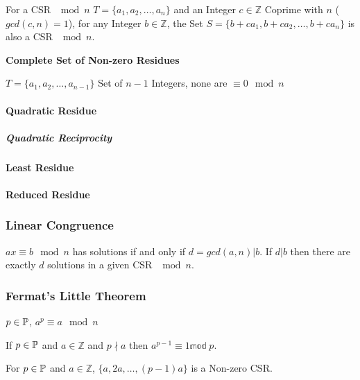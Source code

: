 For a CSR $\mod n$ $T = \{a_1, a_2, \ldots, a_n\}$ and an
Integer $c \in \mathbb{Z}$ Coprime with $n$ ($gcd(c,n) = 1$), for any
Integer $b \in \mathbb{Z}$, the Set $S = \{b + ca_1, b + ca_2, \ldots,
b + ca_n \}$ is also a CSR $\mod n$.



\textbf{Complete Set of Non-zero Residues}

$T = \{ a_1, a_2, \ldots, a_{n-1} \}$ Set of $n-1$ Integers, none are
$\equiv 0 \mod n$



\paragraph{Quadratic Residue}\label{sec:quadratic_residue}\hfill

\subparagraph{Quadratic Reciprocity}\label{sec:quadratic_reciprocity}\hfill



\paragraph{Least Residue}\label{sec:least_residue}\hfill

\paragraph{Reduced Residue}\label{sec:reduced_residue}\hfill



\subsubsection{Linear Congruence}\label{sec:linear_congruence}

$ax \equiv b \mod n$ has solutions if and only if $d = gcd(a,n) | b$.
If $d|b$ then there are exactly $d$ solutions in a given CSR $\mod n$.



\subsubsection{Fermat's Little Theorem}\label{sec:fermat_little}

$p \in \mathbb{P}$, $a^p \equiv a \mod n$

If $p \in \mathbb{P}$ and $a \in \mathbb{Z}$ and $p \nmid a$ then
$a^{p-1} \equiv 1 \mathbb{mod}\;p$.

For $p \in \mathbb{P}$ and $a \in \mathbb{Z}$, $\{ a, 2a, \ldots, (p-1)a
\}$ is a Non-zero CSR.



